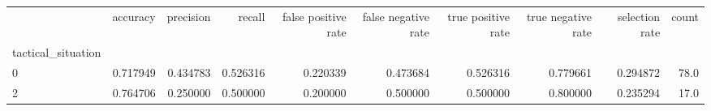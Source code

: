 \begin{tabular}{lrrrrrrrrr}
\toprule
{} &  accuracy &  precision &    recall &  false positive rate &  false negative rate &  true positive rate &  true negative rate &  selection rate &  count \\
tactical\_situation &           &            &           &                      &                      &                     &                     &                 &        \\
\midrule
0                  &  0.717949 &   0.434783 &  0.526316 &             0.220339 &             0.473684 &            0.526316 &            0.779661 &        0.294872 &   78.0 \\
2                  &  0.764706 &   0.250000 &  0.500000 &             0.200000 &             0.500000 &            0.500000 &            0.800000 &        0.235294 &   17.0 \\
\bottomrule
\end{tabular}
